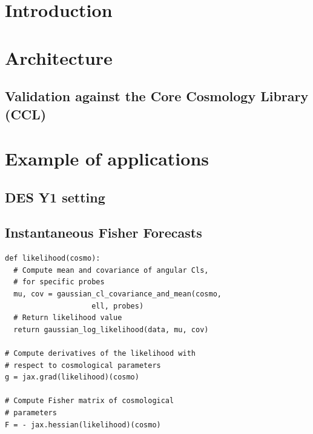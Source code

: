 \documentclass[final,5p,times,twocolumn,authoryear]{elsarticle}
\begin{document}


\section{Introduction}



\section{Architecture}

\subsection{Validation against the Core Cosmology Library (CCL)} 

\section{Example of applications}

\subsection{DES Y1 setting}

\subsection{Instantaneous Fisher Forecasts}

\begin{verbatim}
def likelihood(cosmo):
  # Compute mean and covariance of angular Cls, 
  # for specific probes
  mu, cov = gaussian_cl_covariance_and_mean(cosmo, 
                    ell, probes)
  # Return likelihood value
  return gaussian_log_likelihood(data, mu, cov)

# Compute derivatives of the likelihood with 
# respect to cosmological parameters
g = jax.grad(likelihood)(cosmo)

# Compute Fisher matrix of cosmological 
# parameters
F = - jax.hessian(likelihood)(cosmo)
\end{verbatim}
\end{document}
